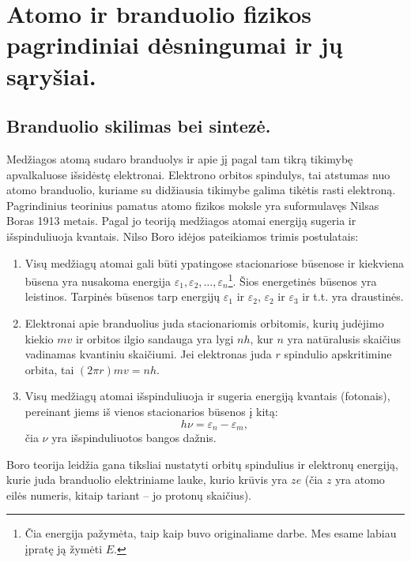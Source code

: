 \chapter{Atomo ir branduolio fizikos pagrindiniai dėsningumai ir jų
sąryšiai.}


\section{Branduolio skilimas bei sintezė.}

Medžiagos atomą sudaro branduolys ir apie jį pagal tam tikrą tikimybę
apvalkaluose išsidėstę elektronai. Elektrono orbitos spindulys, tai
atstumas nuo atomo branduolio, kuriame su didžiausia tikimybe galima
tikėtis rasti elektroną. Pagrindinius teorinius pamatus atomo fizikos
moksle yra suformulavęs Nilsas Boras 1913 metais. Pagal jo teoriją
medžiagos atomai energiją sugeria ir išspinduliuoja kvantais. Nilso
Boro idėjos pateikiamos trimis postulatais:
\begin{enumerate}
  \item {} Visų medžiagų atomai gali
    būti ypatingose stacionariose būsenose ir kiekviena būsena yra
    nusakoma energija
    $\varepsilon_{1}, \varepsilon_{2}, \ldots, \varepsilon_{n}$\footnote{
    Čia energija pažymėta, taip kaip buvo originaliame darbe. Mes
    esame labiau įpratę ją žymėti $E$.}. Šios energetinės būsenos
    yra leistinos. Tarpinės būsenos tarp energijų $\varepsilon_{1}$ ir
    $\varepsilon_{2}$, $\varepsilon_{2}$ ir $\varepsilon_{3}$ ir t.t.
    yra draustinės.
  \item {} Elektronai apie branduolius
    juda stacionariomis orbitomis, kurių judėjimo kiekio $mv$ ir
    orbitos ilgio sandauga yra lygi $nh$, kur $n$ yra natūralusis
    skaičius vadinamas kvantiniu skaičiumi. Jei elektronas juda
    $r$ spindulio apskritimine orbita, tai $(2 \pi r) m v = nh$.
  \item {} Visų medžiagų atomai išspinduliuoja
    ir sugeria energiją kvantais (fotonais), pereinant jiems iš
    vienos stacionarios būsenos į kitą:
    \begin{equation*}
      h \nu = \varepsilon_{n} - \varepsilon_{m},
    \end{equation*}
    čia $\nu$ yra išspinduliuotos bangos dažnis.
\end{enumerate}

Boro teorija leidžia gana tiksliai nustatyti orbitų spindulius ir
elektronų energiją, kurie juda branduolio elektriniame lauke,
kurio krūvis yra $ze$ (čia $z$ yra atomo eilės numeris, kitaip
tariant – jo protonų skaičius).

